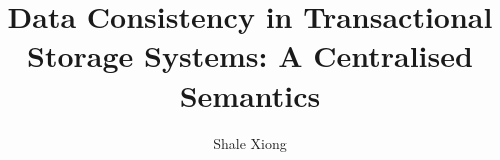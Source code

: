 \documentclass[a4paper,UKenglish,cleveref,autoref,thm-restate,authorcolumns,anonymous]{lipics-v2019}
\title{%
Data Consistency in Transactional Storage Systems: 
A Centralised Semantics%
}
\author{Shale Xiong}{Arm research, UK}{shale.xiong@arm.com}{[orcid]}{[funding]}
\newcommand{\RootPath}{.}
\begin{document}
\maketitle

\begin{abstract}

\end{abstract}






%





\newpage
\onecolumn
\appendix

%

\end{document}
